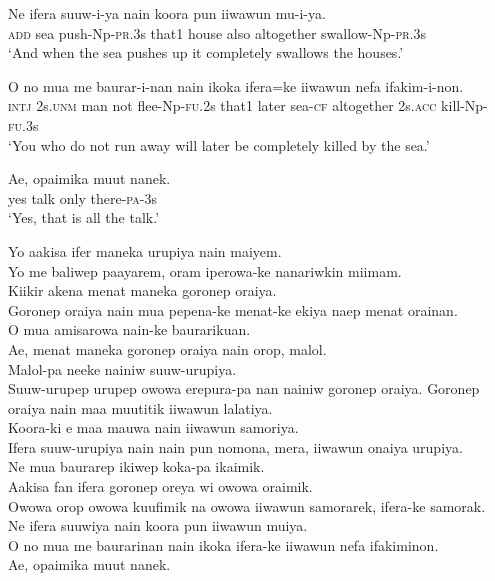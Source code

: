 \ea\label{ex:a:x16}
\gll  Ne  ifera  suuw-i-ya  nain  koora  pun  iiwawun  mu-i-ya. \\
\textsc{add}  sea  push-Np-\textsc{pr}.3s  that1  house  also  altogether  swallow-Np-\textsc{pr}.3s \\
\glt ‘And when the sea pushes up it completely swallows the houses.’ \\
\z


\ea\label{ex:a:x17}
\gll  O  no  mua  me  baurar-i-nan  nain  ikoka  ifera=ke  iiwawun      nefa  ifakim-i-non. \\
\textsc{intj}  2s.\textsc{unm}  man  not  flee-Np-\textsc{fu}.2s  that1  later  sea-\textsc{cf}  altogether 2s.\textsc{acc}  kill-Np-\textsc{fu}.3s \\


\glt ‘You who do not run away will later be completely killed by the sea.’ \\
\z


\ea\label{ex:a:x18}
\gll  Ae,  opaimika  muut  nanek. \\
yes  talk  only  there-\textsc{pa}-3s \\
\glt ‘Yes, that is all the talk.’ \\
\z


Yo aakisa ifer maneka urupiya nain maiyem. \\
Yo me baliwep paayarem, oram iperowa-ke nanariwkin miimam. \\
Kiikir akena menat maneka goronep oraiya. \\
Goronep oraiya nain mua pepena-ke menat-ke ekiya naep menat orainan. \\
O mua amisarowa nain-ke baurarikuan. \\
Ae, menat maneka goronep oraiya nain orop, malol. \\
Malol-pa neeke nainiw suuw-urupiya. \\
\textrm{Suuw-urupep urupep owowa erepura-pa nan nainiw goronep oraiya.}
Goronep oraiya nain maa muutitik iiwawun lalatiya. \\
Koora-ki e maa mauwa nain iiwawun samoriya. \\
Ifera suuw-urupiya nain nain pun nomona, mera, iiwawun onaiya urupiya. \\
Ne mua baurarep  ikiwep  koka-pa ikaimik. \\
Aakisa fan ifera goronep oreya  wi owowa oraimik. \\
Owowa orop owowa kuufimik na owowa iiwawun samorarek, ifera-ke samorak. \\
Ne ifera suuwiya nain koora pun iiwawun muiya. \\
O no mua me baurarinan nain ikoka ifera-ke iiwawun nefa ifakiminon. \\
\textrm{Ae, opaimika muut nanek.}
